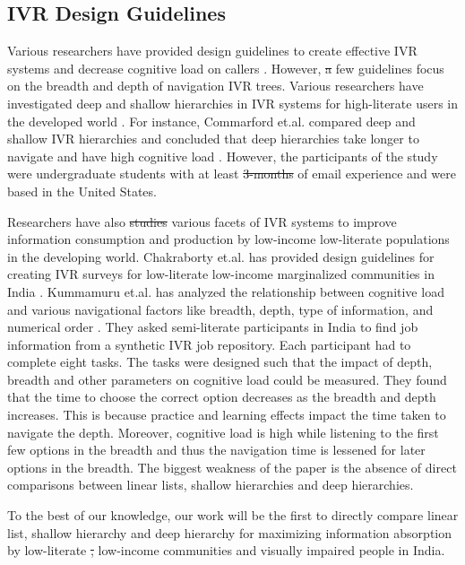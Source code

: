 \documentclass{sigchi}
\providecommand{\DIFaddtex}[1]{{\protect\color{blue}\uwave{#1}}} %
\providecommand{\DIFdeltex}[1]{{\protect\color{red}\sout{#1}}}                      %
\providecommand{\DIFaddbegin}{} %
\providecommand{\DIFaddend}{} %
\providecommand{\DIFdelbegin}{} %
\providecommand{\DIFdelend}{} %
\providecommand{\DIFadd}[1]{\texorpdfstring{\DIFaddtex{#1}}{#1}} %
\providecommand{\DIFdel}[1]{\texorpdfstring{\DIFdeltex{#1}}{}} %
\begin{document}
\subsection{IVR Design Guidelines}
Various researchers have provided design guidelines to create effective IVR systems and decrease cognitive load on callers	 \cite{Ndwe2008,Suhm2008,MSDNSpeech,Halstead-Nussloch1989}. However, \DIFdelbegin \DIFdel{a }\DIFdelend few guidelines focus on the breadth and depth of navigation IVR trees. Various researchers have investigated deep and shallow hierarchies in IVR systems for high-literate users in the developed world \cite{Huguenard1997,Virzi1997,Commarford2008}. For instance, Commarford et.al. compared deep and shallow IVR hierarchies and concluded that deep hierarchies take longer to navigate and have high cognitive load \cite{Commarford2008}. However, the participants of the study were undergraduate students with at least \DIFdelbegin \DIFdel{3-months }\DIFdelend \DIFaddbegin \DIFadd{three months }\DIFaddend of email experience and were based in the United States. 

Researchers have also \DIFdelbegin \DIFdel{studies }\DIFdelend \DIFaddbegin \DIFadd{studied }\DIFaddend various facets of IVR systems to improve information consumption and production by low-income low-literate populations in the developing world. Chakraborty et.al. has provided design guidelines for creating IVR surveys for low-literate low-income marginalized communities in India \cite{Chakraborty2013}. Kummamuru et.al. has analyzed the relationship between cognitive load and various navigational factors like breadth, depth, type of information, and numerical order \cite{Kummamuru2012}. They asked semi-literate participants in India to find job information from a synthetic IVR job repository. Each participant had to complete eight tasks. The tasks were designed such that the impact of depth, breadth and other parameters on cognitive load could be measured. They found that the time to choose the correct option decreases as the breadth and depth increases. This is because practice and learning effects impact the time taken to navigate the depth. Moreover, cognitive load is high while listening to the first few options in the breadth and thus the navigation time is lessened for later options in the breadth. The biggest weakness of the paper is the absence of direct comparisons between linear lists, shallow hierarchies and deep hierarchies.

To the best of our knowledge, our work will be the first to directly compare linear list, shallow hierarchy and deep hierarchy for maximizing information absorption by low-literate \DIFdelbegin \DIFdel{, }\DIFdelend low-income communities and visually impaired people in India. 
\end{document}
